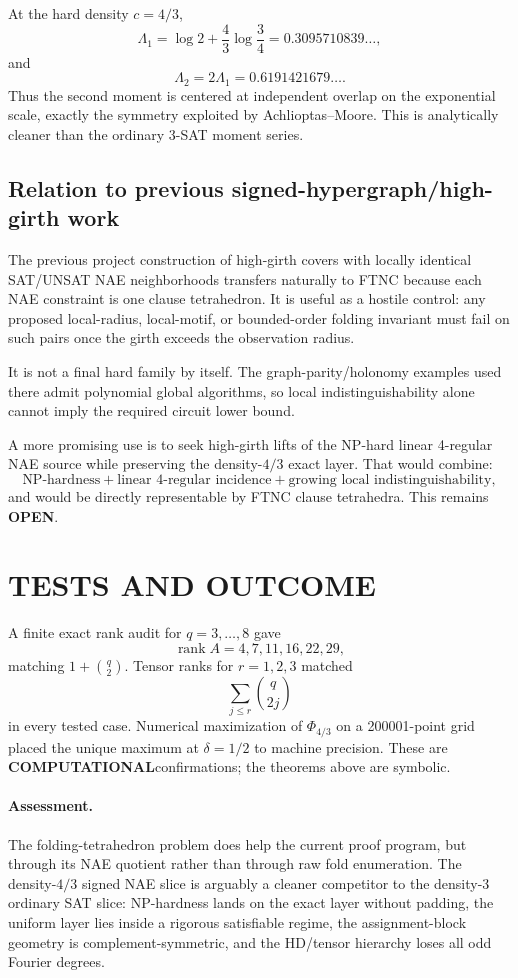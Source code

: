 \documentclass[11pt]{article}
\newcommand{\COMP}{\textbf{COMPUTATIONAL}}
\newcommand{\OPEN}{\textbf{OPEN}}
\begin{document}
At the hard density $c=4/3$,
\[
\Lambda_1
=
\log2+\frac43\log\frac34
=
0.3095710839\ldots,
\]
and
\[
\Lambda_2
=
2\Lambda_1
=
0.6191421679\ldots.
\]
Thus the second moment is centered at independent overlap on the exponential scale, exactly the symmetry exploited by Achlioptas--Moore. This is analytically cleaner than the ordinary 3-SAT moment series.

\subsection{Relation to previous signed-hypergraph/high-girth work}
The previous project construction of high-girth covers with locally identical SAT/UNSAT NAE neighborhoods transfers naturally to FTNC because each NAE constraint is one clause tetrahedron. It is useful as a hostile control: any proposed local-radius, local-motif, or bounded-order folding invariant must fail on such pairs once the girth exceeds the observation radius.

It is not a final hard family by itself. The graph-parity/holonomy examples used there admit polynomial global algorithms, so local indistinguishability alone cannot imply the required circuit lower bound.

A more promising use is to seek high-girth lifts of the NP-hard linear 4-regular NAE source while preserving the density-$4/3$ exact layer. That would combine:
\[
\text{NP-hardness}
+
\text{linear 4-regular incidence}
+
\text{growing local indistinguishability},
\]
and would be directly representable by FTNC clause tetrahedra. This remains \OPEN.

\section{TESTS AND OUTCOME}
A finite exact rank audit for $q=3,\ldots,8$ gave
\[
\operatorname{rank}A=4,7,11,16,22,29,
\]
matching $1+\binom q2$. Tensor ranks for $r=1,2,3$ matched
\[
\sum_{j\le r}\binom q{2j}
\]
in every tested case. Numerical maximization of $\Phi_{4/3}$ on a 200001-point grid placed the unique maximum at $\delta=1/2$ to machine precision. These are \COMP confirmations; the theorems above are symbolic.

\paragraph{Assessment.}
The folding-tetrahedron problem does help the current proof program, but through its NAE quotient rather than through raw fold enumeration. The density-$4/3$ signed NAE slice is arguably a cleaner competitor to the density-3 ordinary SAT slice: NP-hardness lands on the exact layer without padding, the uniform layer lies inside a rigorous satisfiable regime, the assignment-block geometry is complement-symmetric, and the HD/tensor hierarchy loses all odd Fourier degrees.
\end{document}
